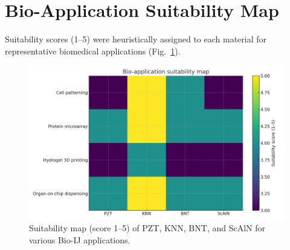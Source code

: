 \section{Bio-Application Suitability Map}

Suitability scores (1--5) were heuristically assigned to each material
for representative biomedical applications
(Fig.~\ref{fig:suitability_map}).

\begin{figure}[htbp]
  \centering
  \includegraphics[width=0.9\linewidth]{figs/bio_application_suitability_heatmap.png}
  \caption{Suitability map (score 1--5) of PZT, KNN, BNT, and ScAlN
  for various Bio-IJ applications.}
  \label{fig:suitability_map}
\end{figure}
